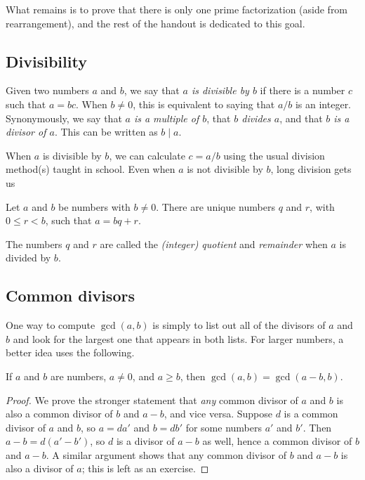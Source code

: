 What remains is to prove that there is only one prime factorization (aside from rearrangement), and the rest of the handout is dedicated to this goal.


\subsection{Divisibility}

Given two numbers $a$ and $b$, we say that \emph{$a$ is divisible by $b$} if there is a number $c$ such that $a = bc$. When $b\neq 0$, this is equivalent to saying that $a/b$ is an integer. Synonymously, we say that \emph{$a$ is a multiple of $b$}, that \emph{$b$ divides $a$}, and that \emph{$b$ is a divisor of $a$}. This can be written as $b\mid a$.

When $a$ is divisible by $b$, we can calculate $c = a/b$ using the usual division method(s) taught in school. Even when $a$ is not divisible by $b$, long division gets us
\begin{proposition}\label{prop:div-algo}
Let $a$ and $b$ be numbers with $b\neq 0$. There are unique numbers $q$ and $r$, with $0\leq r < b$, such that $a = bq + r$.
\end{proposition}
The numbers $q$ and $r$ are called the \emph{(integer) quotient} and \emph{remainder} when $a$ is divided by $b$.


\subsection{Common divisors}

One way to compute $\gcd(a,b)$ is simply to list out all of the divisors of $a$ and $b$ and look for the largest one that appears in both lists. For larger numbers, a better idea uses the following.

\begin{proposition}
If $a$ and $b$ are numbers, $a\neq 0$, and $a\geq b$, then $\gcd(a,b) = \gcd(a - b, b)$.
\end{proposition}
\begin{proof}
We prove the stronger statement that \textit{any} common divisor of $a$ and $b$ is also a common divisor of $b$ and $a - b$, and vice versa. Suppose $d$ is a common divisor of $a$ and $b$, so $a = da'$ and $b = db'$ for some numbers $a'$ and $b'$. Then $a - b = d(a' - b')$, so $d$ is a divisor of $a - b$ as well, hence a common divisor of $b$ and $a - b$. A similar argument shows that any common divisor of $b$ and $a - b$ is also a divisor of $a$; this is left as an exercise.
\end{proof}

